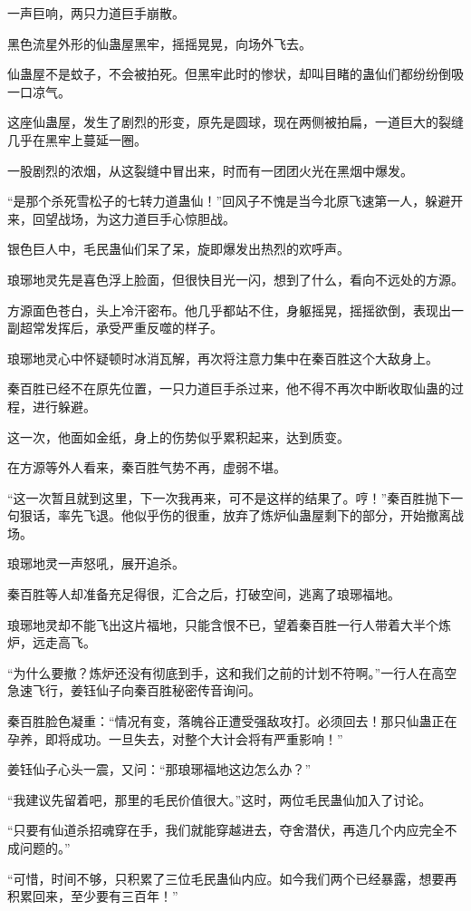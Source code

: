 \begin{this_body}
一声巨响，两只力道巨手崩散。

黑色流星外形的仙蛊屋黑牢，摇摇晃晃，向场外飞去。

仙蛊屋不是蚊子，不会被拍死。但黑牢此时的惨状，却叫目睹的蛊仙们都纷纷倒吸一口凉气。

这座仙蛊屋，发生了剧烈的形变，原先是圆球，现在两侧被拍扁，一道巨大的裂缝几乎在黑牢上蔓延一圈。

一股剧烈的浓烟，从这裂缝中冒出来，时而有一团团火光在黑烟中爆发。

“是那个杀死雪松子的七转力道蛊仙！”回风子不愧是当今北原飞速第一人，躲避开来，回望战场，为这力道巨手心惊胆战。

银色巨人中，毛民蛊仙们呆了呆，旋即爆发出热烈的欢呼声。

琅琊地灵先是喜色浮上脸面，但很快目光一闪，想到了什么，看向不远处的方源。

方源面色苍白，头上冷汗密布。他几乎都站不住，身躯摇晃，摇摇欲倒，表现出一副超常发挥后，承受严重反噬的样子。

琅琊地灵心中怀疑顿时冰消瓦解，再次将注意力集中在秦百胜这个大敌身上。

秦百胜已经不在原先位置，一只力道巨手杀过来，他不得不再次中断收取仙蛊的过程，进行躲避。

这一次，他面如金纸，身上的伤势似乎累积起来，达到质变。

在方源等外人看来，秦百胜气势不再，虚弱不堪。

“这一次暂且就到这里，下一次我再来，可不是这样的结果了。哼！”秦百胜抛下一句狠话，率先飞退。他似乎伤的很重，放弃了炼炉仙蛊屋剩下的部分，开始撤离战场。

琅琊地灵一声怒吼，展开追杀。

秦百胜等人却准备充足得很，汇合之后，打破空间，逃离了琅琊福地。

琅琊地灵却不能飞出这片福地，只能含恨不已，望着秦百胜一行人带着大半个炼炉，远走高飞。

“为什么要撤？炼炉还没有彻底到手，这和我们之前的计划不符啊。”一行人在高空急速飞行，姜钰仙子向秦百胜秘密传音询问。

秦百胜脸色凝重：“情况有变，落魄谷正遭受强敌攻打。必须回去！那只仙蛊正在孕养，即将成功。一旦失去，对整个大计会将有严重影响！”

姜钰仙子心头一震，又问：“那琅琊福地这边怎么办？”

“我建议先留着吧，那里的毛民价值很大。”这时，两位毛民蛊仙加入了讨论。

“只要有仙道杀招魂穿在手，我们就能穿越进去，夺舍潜伏，再造几个内应完全不成问题的。”

“可惜，时间不够，只积累了三位毛民蛊仙内应。如今我们两个已经暴露，想要再积累回来，至少要有三百年！”


\end{this_body}
